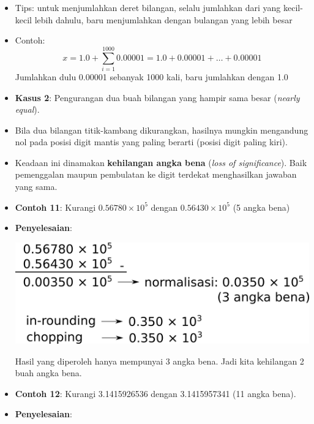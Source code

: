 \documentclass[pdflatex,compress]{beamer}
\begin{document}
\begin{frame}
	\begin{itemize}
		\item Tips: untuk menjumlahkan deret bilangan, selalu jumlahkan dari yang kecil-kecil lebih dahulu, baru menjumlahkan dengan bulangan yang lebih besar
		\item Contoh: \[ x = 1.0 + \sum_{i=1}^1000 0.00001 = 1.0 + 0.00001 + \dots + 0.00001 \]
		Jumlahkan dulu 0.00001 sebanyak 1000 kali, baru jumlahkan dengan 1.0
	\end{itemize}
\end{frame}

\begin{frame}
	\begin{itemize}
		\item \textbf{Kasus 2}: Pengurangan dua buah bilangan yang hampir sama besar (\textit{nearly equal}).
		\item Bila dua bilangan titik-kambang dikurangkan, hasilnya mungkin mengandung nol pada posisi digit mantis yang paling berarti (posisi digit paling kiri).
		\item Keadaan ini dinamakan \textbf{kehilangan angka bena} (\textit{loss of significance}). Baik pemenggalan maupun pembulatan ke digit terdekat menghasilkan jawaban yang sama.
	\end{itemize}
\end{frame}

\begin{frame}
	\begin{itemize}
		\item \textbf{Contoh 11}: Kurangi $ 0.56780 \times 10^5 $ dengan $ 0.56430 \times 10^5 $ (5 angka bena)
		\item[] \textbf{Penyelesaian}:
		\begin{center}
			\includegraphics[width=0.8\linewidth]{img/img105.png}
		\end{center}
		\ite[] Hasil yang diperoleh hanya mempunyai 3 angka bena. Jadi kita kehilangan 2 buah angka bena.
	\end{itemize}
\end{frame}

\begin{frame}
	\begin{itemize}
		\item \textbf{Contoh 12}: Kurangi 3.1415926536 dengan
		3.1415957341 (11 angka bena).
		\item[] \textbf{Penyelesaian}:
		
	\end{itemize}
\end{frame}
	
\end{document}
